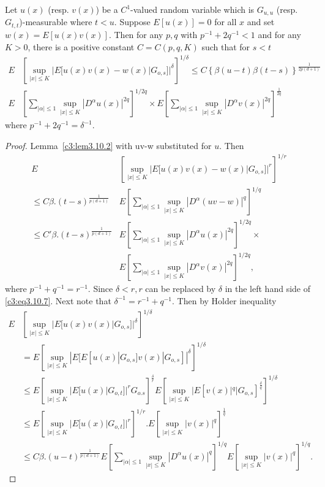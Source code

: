 \begin{Lemma}\label{c3:lem3.10.3}%
  Let $u(x)$ (resp. $v(x)$) be a $C^1$-valued random variable which is
  $G_{u,u}$ (resp. $G_{t,t}$)-measurable where $t < u$. Suppose
  $E[u(x)]=0$ for all $x$ and set $w(x)=E[u(x)v(x)]$. Then for any
  $p,q$ with $p^{-1}+2q^{-1}<1$ and for any $K > 0$, there is a
  positive constant $C=C(p,q,K)$ such that for $s<t$ 
  \begin{align*}
    E & \left[ \sup_{|x| \leq K} |E [u(x)v(x) - 
    w (x)|G_{o,s}]|^{\delta}\right]^{1/
      \delta} 
    \leq C \left\{ \beta (u-t) \beta(t-s)\right\}^{\frac{1}{2p(d+1)}} \\ 
    E & \left[\sum_{|\alpha| \leq 1} \sup_{|x| \leq K} |D^{\alpha}u
      (x)|^{2q}\right]^{1/ 2q} \times
    E\left[\sum_{|\alpha| \leq 1} \sup_{|x| \leq K} |D^{\alpha}v
    (x)|^{2q}\right]^{\frac{1}{2q}} \tag{3.10.6}\label{c3:eq3.10.6} 
  \end{align*}\pageoriginale
  where $p^{-1} + 2q^{-1} = \delta^{-1}$.
\end{Lemma}

\begin{proof}
  Lemma~\ref{c3:lem3.10.2} with uv-w substituted for $u$.  Then 
  \begin{align*}
  E&\left[ \sup_{|x| \leq K}  | E [ u (x) v(x) -w(x)|G_{o,s}]|^{r}\right]^{1 /r}\\
    \leq C \beta.(t-s)^{\frac{1}{p(d+1)}} & E\left[\sum_{|\alpha| \leq 1}
      \sup_{|x| \leq K} |D^{\alpha}(uv- w)|^{q}\right]^{1/ q}\\ 
    \leq C' \beta.(t-s)^{\frac{1}{p(d+1)}} & E\left[\sum_{|\alpha| \leq 1}
      \sup_{|x| \leq K} |D^{\alpha}u(x) |^{2q}\right]^{1/ 2q} \times \\ 
     & E\left[\sum_{|\alpha| \leq 1} \sup_{|x| \leq K} |D^{\alpha}v(x)
      |^{2q}\right]^{1/ 2q}, \tag{3.10.7}\label{c3:eq3.10.7} 
  \end{align*}
  where $p^{-1}+ q^{-1} = r^{-1}$. Since $\delta < r, r$ can be
  replaced by $\delta$ in the left hand side of \eqref{c3:eq3.10.7}. Next note
  that $\delta^{-1} =  r^{-1}+q^{-1}$. Then by Holder inequality  
  \begin{align*}  
    E& \left[ \sup_{|x| \leq K}
      |E[u(x)v(x)|G_{o,s}]|^{\delta}\right]^{1 / \delta}\\ 
    & = E\left[ \sup_{|x| \leq K}
      |E[E[u(x)|G_{o,s}]v(x)|G_{o,s}]|^{\delta}\right]^{1 / \delta}\\ 
    & \leq  E\left[ \sup_{|x| \leq K}
      |E[u(x)|G_{o,t}]|^rG_{o.s}\right]^{\frac{\delta}{r}} 
        E\left[ \sup_{|x| \leq K} |E[v(x)|^q|
              G_{o,s}]^{\frac{\delta}{q}}\right]^{ 1/ \delta}\\ 
    & \leq E\left[ \sup_{|x| \leq K} |E[u(x)|G_{o,t}]|^r\right]^{1 /r}. E\left[
              \sup_{|x| \leq K} |v(x)|^q\right]^{\frac{1}{q}}\\ 
    & \leq C \beta.(u-t)^{\frac{1}{p(d+1)}} E\left[\sum_{|\alpha| \leq 1}
              \sup_{|x| \leq K} |D^{\alpha}u(x)|^{q}\right]^{1/ q} E\left[
              \sup_{|x| \leq K} |v(x)|^q\right]^{1/q}. 
  \end{align*}
\end{proof}

